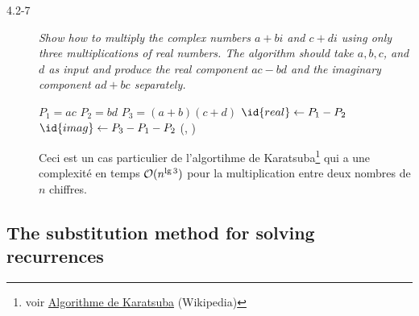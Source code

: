 \begin{description}
  \item[4.2-7] {\itshape Show how to multiply the complex numbers $a + bi$ and $c + di$ using only three multiplications of real numbers. The algorithm should take $a, b, c$, and $d$ as input and produce the real component $ac-bd$ and the imaginary component $ad + bc$ separately.}
    \begin{ex}
      \begin{codebox}%
        \li $P_1 = ac$
        \li $P_2 = bd$
        \li $P_3 = (a+b)(c+d)$
        \li $\id{real} \gets P_1 - P_2$
        \li $\id{imag} \gets P_3-P_1-P_2$
        \li \Return (, )
      \end{codebox}

      Ceci est un cas particulier de l'algortihme de Karatsuba\footnote{voir \href{https://en.wikipedia.org/wiki/Karatsuba_algorithm}{Algorithme de Karatsuba} (Wikipedia)} qui a une complexit\'e en temps $\mathcal{O}(n^{\lg 3})$ pour la multiplication entre deux nombres de $n$ chiffres.

    \end{ex}

\end{description}

\subsection{The substitution method for solving recurrences}

